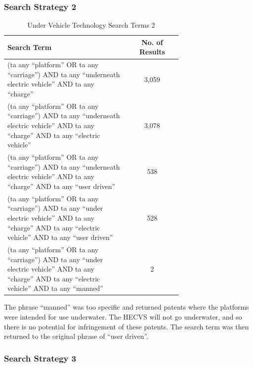 \documentclass [12pt]{article}
\begin{document}
\subsubsection{Search Strategy 2}

\begin{table}[H]
    \centering
    \setlength{\arrayrulewidth}{1.5pt}
    \begin{tabular}{|p{0.7\linewidth}|c|}
    \hline
    \cellcolor{gray!40}Search Term & \cellcolor{gray!40}No. of Results \\
    \hline
    (ta any “platform” OR ta any “carriage”) AND ta any “underneath electric vehicle” AND ta any “charge” & 3,059 \\
    \hline
    (ta any “platform” OR ta any “carriage”) AND ta any “underneath electric vehicle” AND ta any “charge” AND ta any “electric vehicle” & 3,078 \\
    \hline
    (ta any “platform” OR ta any “carriage”) AND ta any “underneath electric vehicle” AND ta any “charge” AND ta any “user driven” & 538 \\
    \hline
    (ta any “platform” OR ta any “carriage”) AND ta any “under electric vehicle” AND ta any “charge” AND ta any “electric vehicle” AND ta any “user driven” & 528 \\
    \hline
    (ta any “platform” OR ta any “carriage”) AND ta any “under electric vehicle” AND ta any “charge” AND ta any “electric vehicle” AND ta any “manned” & 2 \\
    \hline
    \end{tabular}
    \caption{Under Vehicle Technology Search Terms 2}
    \label{table:under_vehicle__search_strat_2}
\end{table}

The phrase “manned” was too specific and returned patents where the platforms were intended for use underwater. The HECVS will not go underwater, and so there is no potential for infringement of these patents. The search term was then returned to the original phrase of “user driven”.

\subsubsection{Search Strategy 3}
\end{document}
